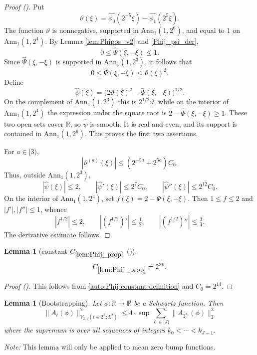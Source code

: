 \documentclass[12pt,reqno]{amsart}
\newcommand{\auto}{{({\tiny\faCar})}}
\theoremstyle{plain}
\newtheorem{lemma}[theorem]{Lemma}
\numberwithin{equation}{section}
\theoremstyle{remark}
\newcommand{\using}[1]{}
\newcommand{\Z}{{\mathbb Z}}
\newcommand{\R}{{\mathbb R}}
\begin{document}
\begin{proof}[Proof \auto]
Put
\[
\vartheta(\xi)=\widehat{\phi_0}(2^{-5}\xi)-\widehat{\phi_1}(2^5\xi).
\]
The function $\vartheta$ is nonnegative, supported in $\mathrm{Ann}_1(1,2^6)$, and equal to $1$ on $\mathrm{Ann}_1(1,2^4)$. By Lemma \ref{lem:Phipos_v2} and \eqref{Phij_psi_der},
\[
0\le\widehat\Psi(\xi,-\xi)\le1.
\]
Since $\widehat\Psi(\xi,-\xi)$ is supported in $\mathrm{Ann}_1(1,2^3)$, it follows that
\begin{equation}\label{eqn:lemPhij_proppf}
0\le\widehat\Psi(\xi,-\xi)\le\vartheta(\xi)^2.
\end{equation}
Define
\begin{equation}\label{def_sqrtpsi}
\widehat\psi(\xi)=\bigl(2\vartheta(\xi)^2-\widehat\Psi(\xi,-\xi)\bigr)^{1/2}.
\end{equation}
On the complement of $\mathrm{Ann}_1(1,2^3)$ this is $2^{1/2}\vartheta$, while on the interior of $\mathrm{Ann}_1(1,2^4)$ the expression under the square root is $2-\widehat\Psi(\xi,-\xi)\ge1$. These two open sets cover $\R$, so $\widehat\psi$ is smooth. It is real and even, and its support is contained in $\mathrm{Ann}_1(1,2^6)$. This proves the first two assertions.

For $a\in[3)$,
\[
|\vartheta^{(a)}(\xi)|
\le (2^{-5a}+2^{5a})C_0.
\]
Thus, outside $\mathrm{Ann}_1(1,2^3)$,
\[
|\widehat\psi(\xi)|\le2,
\qquad
|\widehat\psi'(\xi)|\le2^7C_0,
\qquad
|\widehat\psi''(\xi)|\le2^{12}C_0.
\]
On the interior of $\mathrm{Ann}_1(1,2^4)$, set $f(\xi)=2-\widehat\Psi(\xi,-\xi)$. Then $1\le f\le2$ and $|f'|,|f''|\le1$, whence
\[
|f^{1/2}|\le2,
\qquad
|(f^{1/2})'|\le\tfrac12,
\qquad
|(f^{1/2})''|\le\tfrac34.
\]
The derivative estimate follows.
\end{proof}

\begin{lemma}[constant $C_{\ref{lem:Phij_prop}}$ \auto]\label{constant Phij proposition}\using{lem:Phij_prop}
\begin{equation}\label{constant Phij proposition bound}
C_{\ref{lem:Phij_prop}}=2^{26}.
\end{equation}
\end{lemma}
\begin{proof}[Proof \auto]
This follows from \eqref{auto:Phij-constant-definition} and $C_0=2^{14}$.
\end{proof}


\begin{lemma}[Bootstrapping]
\label{lem:bootstrap}
Let $\phi:\R\to \R$ be a Schwartz function.
Then
    \begin{equation}\label{auto:dyadic-variation-bootstrap}\|A_{t}(\phi)\|^2_{V_{2,J}(t\in 2^{\Z}; L^2)} \le  4 \cdot \sup \sum_{\ell\in [J)} \|A_{2^{k_{\ell}}}(\phi)\|^2_2     \end{equation}
    where the supremum is over all sequences of integers $k_0<\cdots <k_{J-1}$.
\end{lemma}
{\em Note:} This lemma will only be applied to mean zero bump functions.
\end{document}
